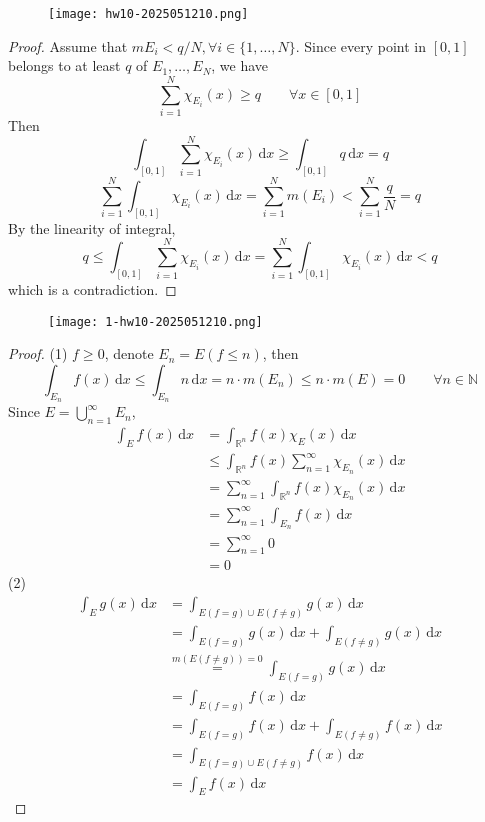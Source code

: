 \begin{exercise}
\begin{figure}[H]
\centering
\texttt{[image: hw10-2025051210.png]}
\label{}
\end{figure}
\end{exercise}
\begin{proof}
Assume that $mE_i<q/N,\forall i\in \{ 1,\dots,N \}$. Since every point in $[0,1]$ belongs to at least $q$ of $E_1,\dots,E_{N}$, we have
\[
\sum_{i=1}^{N} \chi_{E_i}(x)\geq q\qquad \forall x\in[0,1]
\]
Then
\[
\int_{[0,1]}^{} \sum_{i=1}^{N} \chi_{E_i}(x) \, \mathrm{d}x \geq \int_{[0,1]}^{} q \, \mathrm{d}x =q
\]
\[
\sum_{i=1}^{N} \int_{[0,1]}^{} \chi_{E_i}(x) \, \mathrm{d}x =\sum_{i=1}^{N} m(E_i)<\sum_{i=1}^{N} \frac{q}{N}=q
\]
By the linearity of integral,
\[
q\leq \int_{[0,1]}^{} \sum_{i=1}^{N} \chi_{E_i}(x) \, \mathrm{d}x =\sum_{i=1}^{N} \int_{[0,1]}^{} \chi_{E_i}(x) \, \mathrm{d}x <q
\]
which is a contradiction.
\end{proof}

\begin{exercise}
\begin{figure}[H]
\centering
\texttt{[image: 1-hw10-2025051210.png]}
\label{}
\end{figure}
\end{exercise}
\begin{proof}
(1)
$f\geq0$, denote $E_n=E(f\leq n)$, then
\[
\int_{E_n}^{} f(x) \, \mathrm{d}x \leq \int_{E_n}^{} n \, \mathrm{d}x =n\cdot m(E_n)\leq n\cdot m(E)=0\qquad \forall n\in \mathbb{N}
\]
Since $E=\bigcup_{n=1}^{\infty }E_n$,
\[
\begin{aligned}
\int_{E}^{} f(x) \, \mathrm{d}x  & =\int_{\mathbb{R}^{n}}^{} f(x)\chi_{E}(x) \, \mathrm{d}x  \\
 & \leq \int_{\mathbb{R}^{n}}^{} f(x)\sum_{n=1}^{\infty} \chi_{E_n}(x) \, \mathrm{d}x  \\
 & =\sum_{n=1}^{\infty} \int_{\mathbb{R}^{n}}^{} f(x)\chi_{E_n}(x) \, \mathrm{d}x  \\
 & =\sum_{n=1}^{\infty} \int_{E_n}^{} f(x) \, \mathrm{d}x  \\
 & =\sum_{n=1}^{\infty} 0 \\
 & =0
\end{aligned}
\]
(2)
\[
\begin{aligned}
\int_{E}^{} g(x) \, \mathrm{d}x  & =\int_{E(f=g)\cup E(f\neq g)}^{} g(x) \, \mathrm{d}x  \\
 & =\int_{E(f=g)}^{} g(x) \, \mathrm{d}x +\int_{E(f\neq g)}^{} g(x) \, \mathrm{d}x   \\
 & \overset{ m(E(f\neq g))=0 }{ = }\int_{E(f=g)}^{} g(x) \, \mathrm{d}x \\
 & =\int_{E(f=g)}^{} f(x) \, \mathrm{d}x \\
 & =\int_{E(f=g)}^{} f(x) \, \mathrm{d}x +\int_{E(f\neq g)}^{} f(x) \, \mathrm{d}x \\
 & =\int_{E(f=g)\cup E(f\neq g)}^{} f(x) \, \mathrm{d}x \\
 & =\int_{E }^{} f(x) \, \mathrm{d}x 
\end{aligned} 
\]
\end{proof}

